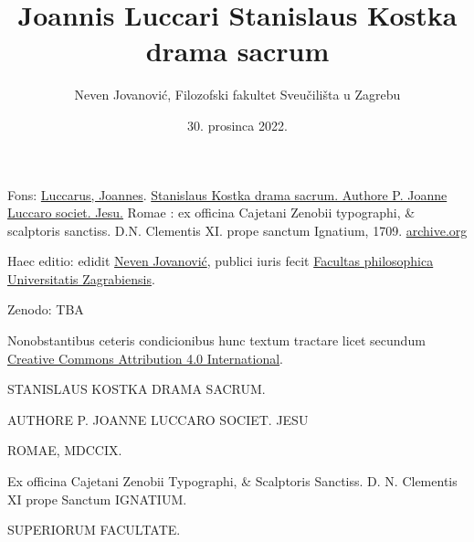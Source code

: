 \documentclass[a4paper,12pt]{article}
\author{Neven Jovanović, Filozofski fakultet Sveučilišta u Zagrebu}
\date{30. prosinca 2022.}
\title{Joannis Luccari Stanislaus Kostka drama sacrum}
\begin{document}
\maketitle
\tableofcontents

\newpage

\noindent Fons: \href{https://www.wikidata.org/wiki/Q114949297}{Luccarus, Joannes}. \uline{Stanislaus Kostka drama sacrum. Authore P. Joanne Luccaro societ. Jesu.} Romae : ex officina Cajetani Zenobii typographi, \& scalptoris sanctiss. D.N. Clementis XI. prope sanctum Ignatium, 1709. \href{https://archive.org/details/bub\_gb\_ldx6wPj7IMMC}{archive.org}

\noindent Haec editio: edidit \href{https://www.wikidata.org/wiki/Q114878204}{Neven Jovanović}, publici iuris fecit \href{https://www.wikidata.org/wiki/Q3445232}{Facultas philosophica Universitatis Zagrabiensis}.

\noindent Zenodo: TBA

\noindent Nonobstantibus ceteris condicionibus hunc textum tractare licet secundum \href{http://creativecommons.org/licenses/by/4.0/}{Creative Commons Attribution 4.0 International}. 



\newpage


STANISLAUS KOSTKA DRAMA SACRUM.

AUTHORE P. JOANNE LUCCARO SOCIET. JESU

ROMAE, MDCCIX.

Ex officina Cajetani Zenobii Typographi, \& Scalptoris Sanctiss. D. N. Clementis XI prope Sanctum IGNATIUM.

SUPERIORUM FACULTATE.

\newpage
\end{document}
